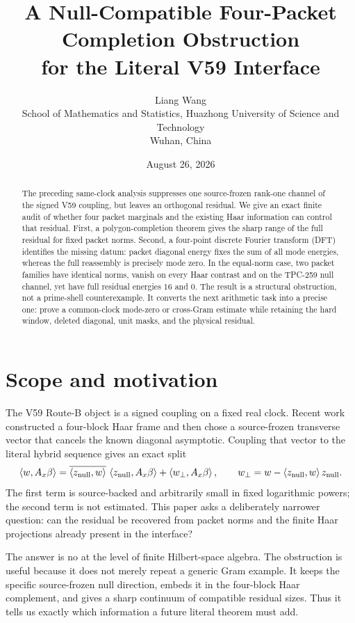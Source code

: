 \documentclass[11pt]{article}
\title{A Null-Compatible Four-Packet Completion Obstruction\\
for the Literal V59 Interface}
\author{Liang Wang\\
School of Mathematics and Statistics, Huazhong University of Science and Technology\\
Wuhan, China}
\date{August 26, 2026}
\theoremstyle{definition}
\newcommand{\ip}[2]{\left\langle #1,#2\right\rangle}
\begin{document}
\maketitle

\begin{abstract}
The preceding same-clock analysis suppresses one source-frozen rank-one channel of
the signed V59 coupling, but leaves an orthogonal residual.  We give an exact finite
audit of whether four packet marginals and the existing Haar information can control
that residual.  First, a polygon-completion theorem gives the sharp range of the
full residual for fixed packet norms.  Second, a four-point discrete Fourier
transform (DFT) identifies the missing datum: packet diagonal energy fixes the sum
of all mode energies, whereas the full reassembly is precisely mode zero.  In the
equal-norm case, two packet families have identical norms, vanish on every Haar
contrast and on the TPC-259 null channel, yet have full residual energies $16$ and
$0$.  The result is a structural obstruction, not a prime-shell counterexample.
It converts the next arithmetic task into a precise one: prove a common-clock
mode-zero or cross-Gram estimate while retaining the hard window, deleted diagonal,
unit masks, and the physical residual.
\end{abstract}

\section{Scope and motivation}

The V59 Route-B object is a signed coupling on a fixed real clock.  Recent work
constructed a four-block Haar frame and then chose a source-frozen transverse vector
that cancels the known diagonal asymptotic.  Coupling that vector to the literal
hybrid sequence gives an exact split
\begin{equation}
 \ip{w}{A_x\beta}
 =\overline{\ip{z_{\rm null}}{w}}\,\ip{z_{\rm null}}{A_x\beta}
   +\ip{w_\perp}{A_x\beta},
 \qquad
 w_\perp=w-\ip{z_{\rm null}}{w}z_{\rm null}.
 \label{eq:tpc259-split}
\end{equation}
The first term is source-backed and arbitrarily small in fixed logarithmic powers;
the second term is not estimated.  This paper asks a deliberately narrower
question: can the residual be recovered from packet norms and the finite Haar
projections already present in the interface?

The answer is no at the level of finite Hilbert-space algebra.  The obstruction is
useful because it does not merely repeat a generic Gram example.  It keeps the
specific source-frozen null direction, embeds it in the four-block Haar complement,
and gives a sharp continuum of compatible residual sizes.  Thus it tells us exactly
which information a future literal theorem must add.
\end{document}
